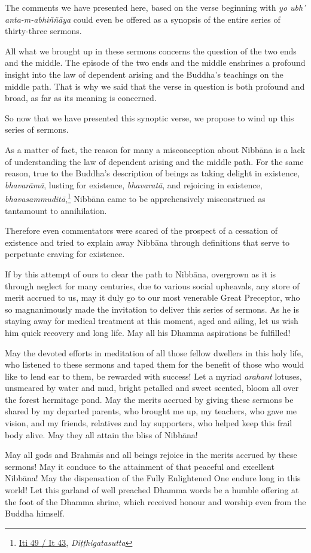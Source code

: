 The comments we have presented here, based on the verse beginning with \emph{yo ubh' anta-m-abhiññāya} could even be offered as a synopsis of the entire series of thirty-three sermons.

All what we brought up in these sermons concerns the question of the two ends and the middle. The episode of the two ends and the middle enshrines a profound insight into the law of dependent arising and the Buddha's teachings on the middle path. That is why we said that the verse in question is both profound and broad, as far as its meaning is concerned.

So now that we have presented this synoptic verse, we propose to wind up this series of sermons.

As a matter of fact, the reason for many a misconception about Nibbāna is a lack of understanding the law of dependent arising and the middle path. For the same reason, true to the Buddha's description of beings as taking delight in existence, \emph{bhavarāmā}, lusting for existence, \emph{bhavaratā}, and rejoicing in existence, \emph{bhavasammuditā},\footnote{\href{https://suttacentral.net/iti49/pli/ms}{Iti 49 / It 43}, \emph{Diṭṭhigatasutta}} Nibbāna came to be apprehensively misconstrued as tantamount to annihilation.

Therefore even commentators were scared of the prospect of a cessation of existence and tried to explain away Nibbāna through definitions that serve to perpetuate craving for existence.

If by this attempt of ours to clear the path to Nibbāna, overgrown as it is through neglect for many centuries, due to various social upheavals, any store of merit accrued to us, may it duly go to our most venerable Great Preceptor, who so magnanimously made the invitation to deliver this series of sermons. As he is staying away for medical treatment at this moment, aged and ailing, let us wish him quick recovery and long life. May all his Dhamma aspirations be fulfilled!

May the devoted efforts in meditation of all those fellow dwellers in this holy life, who listened to these sermons and taped them for the benefit of those who would like to lend ear to them, be rewarded with success! Let a myriad \emph{arahant} lotuses, unsmeared by water and mud, bright petalled and sweet scented, bloom all over the forest hermitage pond. May the merits accrued by giving these sermons be shared by my departed parents, who brought me up, my teachers, who gave me vision, and my friends, relatives and lay supporters, who helped keep this frail body alive. May they all attain the bliss of Nibbāna!

May all gods and Brahmās and all beings rejoice in the merits accrued by these sermons! May it conduce to the attainment of that peaceful and excellent Nibbāna! May the dispensation of the Fully Enlightened One endure long in this world! Let this garland of well preached Dhamma words be a humble offering at the foot of the Dhamma shrine, which received honour and worship even from the Buddha himself.
